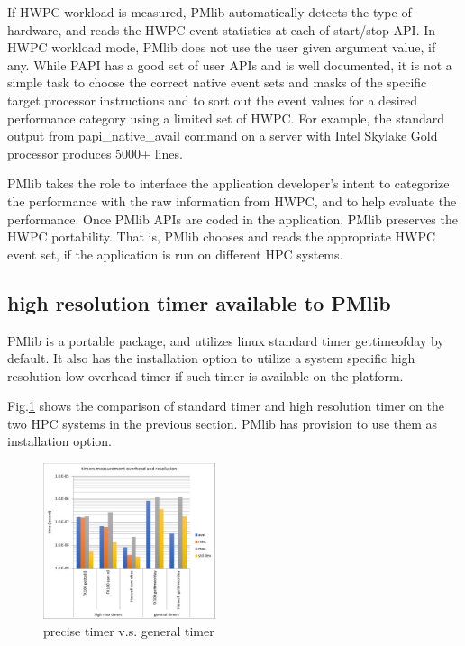\documentclass[conference]{IEEEtran}
\begin{document}
If HWPC workload is measured,
PMlib automatically detects the type of hardware, and reads the HWPC
event statistics at each of start/stop API.
In HWPC workload mode, PMlib does not use the user given argument value,
if any.
While PAPI has a good set of user APIs and is well documented,
it is not a simple task to choose the correct native event sets and masks
of the specific target processor instructions and to sort out the event
values for a desired performance category using a limited set of HWPC.
For example,
the standard output from papi\_native\_avail command on a server with
Intel Skylake Gold processor produces 5000+ lines.

PMlib takes the role to interface the application developer's intent to
categorize the performance with the raw information from HWPC, and to
help evaluate the performance.
Once PMlib APIs are coded in the application, PMlib preserves the HWPC
portability. That is, PMlib chooses and reads the appropriate HWPC event
set, if the application is run on different HPC systems.




\subsection{high resolution timer available to PMlib}
PMlib is a portable package, and utilizes linux standard timer
gettimeofday by default. It also has the installation option to utilize
a system specific high resolution low overhead timer if such timer is
available on the platform.

Fig.\ref{fig:precise-timer} shows the comparison of standard timer and
high resolution timer on the two HPC systems in the previous section.
PMlib has provision to use them as installation option.
\begin{figure}[tb]
\centering
\includegraphics[width=0.45\textwidth]{figs/precise-timer.pdf}
\caption{precise timer v.s. general timer}
\label{fig:precise-timer}
\end{figure}
\end{document}
